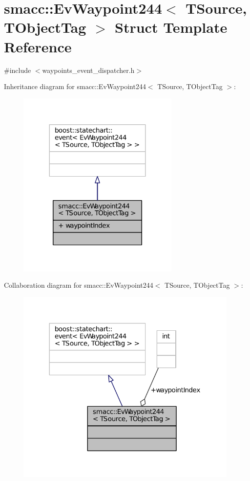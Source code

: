 \hypertarget{structsmacc_1_1EvWaypoint244}{}\section{smacc\+:\+:Ev\+Waypoint244$<$ T\+Source, T\+Object\+Tag $>$ Struct Template Reference}
\label{structsmacc_1_1EvWaypoint244}


{\ttfamily \#include $<$waypoints\+\_\+event\+\_\+dispatcher.\+h$>$}



Inheritance diagram for smacc\+:\+:Ev\+Waypoint244$<$ T\+Source, T\+Object\+Tag $>$\+:
\nopagebreak
\begin{figure}[H]
\begin{center}
\leavevmode
\includegraphics[width=227pt]{structsmacc_1_1EvWaypoint244__inherit__graph}
\end{center}
\end{figure}


Collaboration diagram for smacc\+:\+:Ev\+Waypoint244$<$ T\+Source, T\+Object\+Tag $>$\+:
\nopagebreak
\begin{figure}[H]
\begin{center}
\leavevmode
\includegraphics[width=312pt]{structsmacc_1_1EvWaypoint244__coll__graph}
\end{center}
\end{figure}
